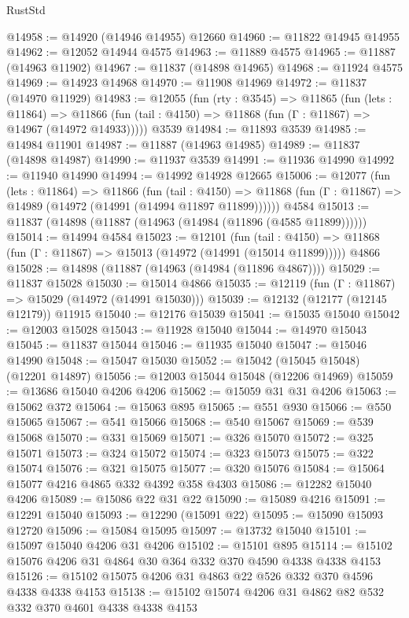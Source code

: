 \begin{lexlean}{RustStd}
\begin{coremodule}
{\begin{coremodule}
{{{{{{{{{{{{{{{{{{{{{{{{{{{{{{{{{{{{{{{{{{{{{{{{{{@14958 := @14920 (@14946 @14955) @12660
@14960 := @11822 @14945 @14955
@14962 := @12052 @14944 @4575
@14963 := @11889 @4575
@14965 := @11887 (@14963 @11902)
@14967 := @11837 (@14898 @14965)
@14968 := @11924 @4575
@14969 := @14923 @14968
@14970 := @11908 @14969
@14972 := @11837 (@14970 @11929)
@14983 := @12055
    (fun (rty : @3545) =>
    @11865
      (fun (lets : @11864) =>
      @11866 (fun (tail : @4150) => @11868 (fun (Γ : @11867) => @14967 (@14972 @14933)))))
    @3539
@14984 := @11893 @3539
@14985 := @14984 @11901
@14987 := @11887 (@14963 @14985)
@14989 := @11837 (@14898 @14987)
@14990 := @11937 @3539
@14991 := @11936 @14990
@14992 := @11940 @14990
@14994 := @14992 @14928 @12665
@15006 := @12077
    (fun (lets : @11864) =>
    @11866
      (fun (tail : @4150) =>
      @11868 (fun (Γ : @11867) => @14989 (@14972 (@14991 (@14994 @11897 @11899))))))
    @4584
@15013 := @11837 (@14898 (@11887 (@14963 (@14984 (@11896 (@4585 @11899))))))
@15014 := @14994 @4584
@15023 := @12101
    (fun (tail : @4150) => @11868 (fun (Γ : @11867) => @15013 (@14972 (@14991 (@15014 @11899)))))
    @4866
@15028 := @14898 (@11887 (@14963 (@14984 (@11896 @4867))))
@15029 := @11837 @15028
@15030 := @15014 @4866
@15035 := @12119 (fun (Γ : @11867) => @15029 (@14972 (@14991 @15030)))
@15039 := @12132 (@12177 (@12145 @12179)) @11915
@15040 := @12176 @15039
@15041 := @15035 @15040
@15042 := @12003 @15028
@15043 := @11928 @15040
@15044 := @14970 @15043
@15045 := @11837 @15044
@15046 := @11935 @15040
@15047 := @15046 @14990
@15048 := @15047 @15030
@15052 := @15042 (@15045 @15048) (@12201 @14897)
@15056 := @12003 @15044 @15048 (@12206 @14969)
@15059 := @13686 @15040 @4206 @4206
@15062 := @15059 @31 @31 @4206
@15063 := @15062 @372
@15064 := @15063 @895
@15065 := @551 @930
@15066 := @550 @15065
@15067 := @541 @15066
@15068 := @540 @15067
@15069 := @539 @15068
@15070 := @331 @15069
@15071 := @326 @15070
@15072 := @325 @15071
@15073 := @324 @15072
@15074 := @323 @15073
@15075 := @322 @15074
@15076 := @321 @15075
@15077 := @320 @15076
@15084 := @15064 @15077 @4216 @4865 @332 @4392 @358 @4303
@15086 := @12282 @15040 @4206
@15089 := @15086 @22 @31 @22
@15090 := @15089 @4216
@15091 := @12291 @15040
@15093 := @12290 (@15091 @22)
@15095 := @15090 @15093 @12720
@15096 := @15084 @15095
@15097 := @13732 @15040
@15101 := @15097 @15040 @4206 @31 @4206
@15102 := @15101 @895
@15114 := @15102 @15076 @4206 @31 @4864 @30 @364 @332 @370 @4590 @4338 @4338 @4153
@15126 := @15102 @15075 @4206 @31 @4863 @22 @526 @332 @370 @4596 @4338 @4338 @4153
@15138 := @15102 @15074 @4206 @31 @4862 @82 @532 @332 @370 @4601 @4338 @4338 @4153
}}}}}}}}}}}}}}}}}}}}}}}}}}}}}}}}}}}}}}}}}}}}}}}}}}
\end{coremodule}}
\end{coremodule}
\end{lexlean}
